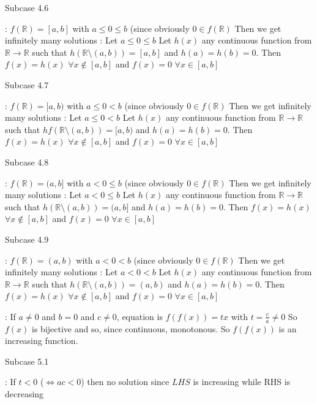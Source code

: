 \begin{solution}
\begin{bolded}Subcase 4.6\end{bolded} : $f(\mathbb R)=[a,b]$ with $a\le 0\le b$ (since obviously $0\in f(\mathbb R)$
Then we get infinitely many solutions :
Let $a\le 0\le b$
Let $h(x)$ any continuous function from $\mathbb R\to\mathbb R$ such that $h(\mathbb R\setminus(a,b))=[a,b]$ and $h(a)=h(b)=0$.
Then $f(x)=h(x)$ $\forall x\notin[a,b]$ and $f(x)=0$ $\forall x\in[a,b]$

\begin{bolded}Subcase 4.7\end{bolded} : $f(\mathbb R)=[a,b)$ with $a\le 0< b$ (since obviously $0\in f(\mathbb R)$
Then we get infinitely many solutions :
Let $a\le 0< b$
Let $h(x)$ any continuous function from $\mathbb R\to\mathbb R$ such that $hf(\mathbb R\setminus(a,b))=[a,b)$ and $h(a)=h(b)=0$.
Then $f(x)=h(x)$ $\forall x\notin[a,b]$ and $f(x)=0$ $\forall x\in[a,b]$

\begin{bolded}Subcase 4.8\end{bolded} : $f(\mathbb R)=(a,b]$ with $a< 0\le b$ (since obviously $0\in f(\mathbb R)$
Then we get infinitely many solutions :
Let $a< 0\le b$
Let $h(x)$ any continuous function from $\mathbb R\to\mathbb R$ such that $h(\mathbb R\setminus(a,b))=(a,b]$ and $h(a)=h(b)=0$.
Then $f(x)=h(x)$ $\forall x\notin[a,b]$ and $f(x)=0$ $\forall x\in[a,b]$

\begin{bolded}Subcase 4.9\end{bolded} : $f(\mathbb R)=(a,b)$ with $a< 0< b$ (since obviously $0\in f(\mathbb R)$
Then we get infinitely many solutions :
Let $a< 0< b$
Let $h(x)$ any continuous function from $\mathbb R\to\mathbb R$ such that $h(\mathbb R\setminus(a,b))=(a,b)$ and $h(a)=h(b)=0$.
Then $f(x)=h(x)$ $\forall x\notin[a,b]$ and $f(x)=0$ $\forall x\in[a,b]$

 : If $a\ne 0$ and $b=0$ and $c\ne 0$, equation is $f(f(x))=tx$ with $t=\frac ca\ne 0$
So $f(x)$ is bijective and so, since continuous, monotonous.
So $f(f(x))$ is an increasing function.

\begin{bolded}Subcase 5.1\end{bolded} : If $t<0$ ($\iff ac<0$) then  no solution since $LHS$ is increasing while RHS is decreasing


\end{solution}
